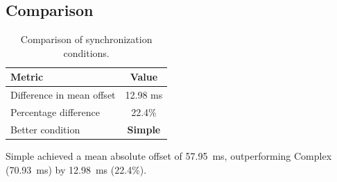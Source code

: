 \subsection*{Comparison}

\begin{table}[h!]
\centering
\begin{tabular}{|l|c|}
\hline
Metric & Value \\
\hline
Difference in mean offset & 12.98 ms \\
Percentage difference & 22.4\% \\
Better condition & \textbf{Simple} \\
\hline
\end{tabular}
\caption{Comparison of synchronization conditions.}
\label{tab:sync_comparison}
\end{table}

Simple achieved a mean absolute offset of 57.95~ms, outperforming Complex (70.93~ms) by 12.98~ms (22.4\%).
